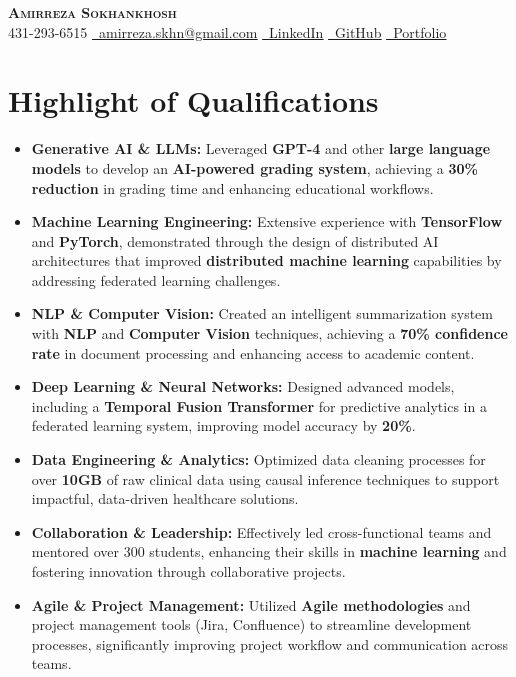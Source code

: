 \documentclass[letterpaper,11pt]{article}
\newcommand{\resumeItem}[1]{
  \item\small{
    #1 \vspace{0pt}
  }
}
\newcommand{\resumeItemListStart}{\begin{itemize}}
\newcommand{\resumeItemListEnd}{\end{itemize}\vspace{-5pt}}
\begin{document}


\begin{center}
    \textbf{\Huge \scshape Amirreza Sokhankhosh} \\ \vspace{1pt}
    \faPhone \small 431-293-6515 \quad
    \href{mailto:amirreza.skhn@gmail.com}{\faEnvelope \ \underline{amirreza.skhn@gmail.com}} \quad
    \href{https://www.linkedin.com/in/amirrezakh/}{\faLinkedin \ \underline{LinkedIn}} \quad
    \href{https://github.com/amirrezaskh}{\faGithub \ \underline{GitHub}} \quad
    \href{https://amirrezaskh.com}{\faBriefcase \ \underline{Portfolio}}
\end{center}

\section{Highlight of Qualifications}
\resumeItemListStart
\resumeItem{\textbf{Generative AI \& LLMs:} Leveraged \textbf{GPT-4} and other \textbf{large language models} to develop an \textbf{AI-powered grading system}, achieving a \textbf{30\% reduction} in grading time and enhancing educational workflows.}
\resumeItem{\textbf{Machine Learning Engineering:} Extensive experience with \textbf{TensorFlow} and \textbf{PyTorch}, demonstrated through the design of distributed AI architectures that improved \textbf{distributed machine learning} capabilities by addressing federated learning challenges.}
\resumeItem{\textbf{NLP \& Computer Vision:} Created an intelligent summarization system with \textbf{NLP} and \textbf{Computer Vision} techniques, achieving a \textbf{70\% confidence rate} in document processing and enhancing access to academic content.}
\resumeItem{\textbf{Deep Learning \& Neural Networks:} Designed advanced models, including a \textbf{Temporal Fusion Transformer} for predictive analytics in a federated learning system, improving model accuracy by \textbf{20\%}.}
\resumeItem{\textbf{Data Engineering \& Analytics:} Optimized data cleaning processes for over \textbf{10GB} of raw clinical data using causal inference techniques to support impactful, data-driven healthcare solutions.}
\resumeItem{\textbf{Collaboration \& Leadership:} Effectively led cross-functional teams and mentored over 300 students, enhancing their skills in \textbf{machine learning} and fostering innovation through collaborative projects.}
\resumeItem{\textbf{Agile \& Project Management:} Utilized \textbf{Agile methodologies} and project management tools (Jira, Confluence) to streamline development processes, significantly improving project workflow and communication across teams.}
\resumeItemListEnd
\end{document}
